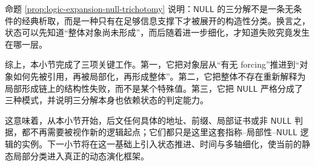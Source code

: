 命题 \ref{prop:logic-expansion-null-trichotomy} 说明：\(\mathsf{NULL}\) 的三分解不是一条无条件的经典析取，而是一种只有在足够信息支撑下才被展开的构造性分类。换言之，状态可以先知道“整体对象尚未形成”，而后随着进一步细化，才知道失败究竟发生在哪一层。

综上，本小节完成了三项关键工作。第一，它把对象层从“有无 forcing”推进到“对象如何先被引用，再被局部化，再形成整体”。第二，它把整体不存在重新解释为局部形成链上的结构性失败，而不是某个特殊值。第三，它把 \(\mathsf{NULL}\) 严格分成了三种模式，并说明三分解本身也依赖状态的判定能力。

这意味着，从本小节开始，后文任何具体的地址、前缀、局部证书或非 \(\mathsf{NULL}\) 判据，都不再需要被视作新的逻辑起点；它们都只是这里这套指称--局部性--\(\mathsf{NULL}\) 逻辑的实例。下一小节将在这一基础上引入状态推进、时间与多轴细化，使当前的静态局部分类进入真正的动态演化框架。
